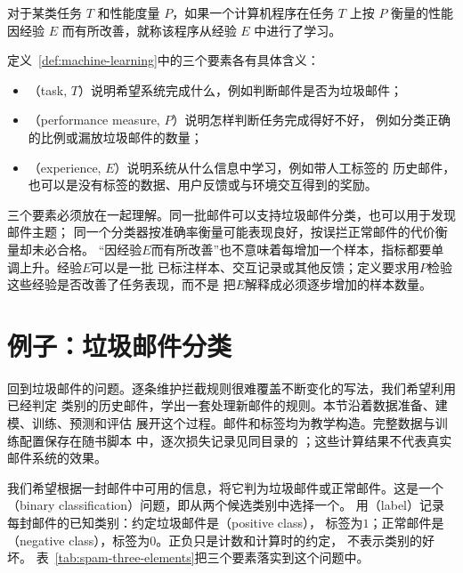 \begin{definition}[机器学习]
\label{def:machine-learning}
对于某类任务 $T$ 和性能度量 $P$，如果一个计算机程序在任务 $T$ 上按 $P$ 衡量的性能
因经验 $E$ 而有所改善，就称该程序从经验 $E$ 中进行了学习。
\end{definition}

定义~\ref{def:machine-learning}中的三个要素各有具体含义：

\begin{itemize}
  \item {}（task, $T$）说明希望系统完成什么，例如判断邮件是否为垃圾邮件；
  \item {}（performance measure, $P$）说明怎样判断任务完成得好不好，
    例如分类正确的比例或漏放垃圾邮件的数量；
  \item {}（experience, $E$）说明系统从什么信息中学习，例如带人工标签的
    历史邮件，也可以是没有标签的数据、用户反馈或与环境交互得到的奖励。
\end{itemize}

三个要素必须放在一起理解。同一批邮件可以支持垃圾邮件分类，也可以用于发现邮件主题；
同一个分类器按准确率衡量可能表现良好，按误拦正常邮件的代价衡量却未必合格。
“因经验$E$而有所改善”也不意味着每增加一个样本，指标都要单调上升。经验$E$可以是一批
已标注样本、交互记录或其他反馈；定义要求用$P$检验这些经验是否改善了任务表现，而不是
把$E$解释成必须逐步增加的样本数量。

\section{例子：垃圾邮件分类}
\label{sec:spam-classification-example}

回到垃圾邮件的问题。逐条维护拦截规则很难覆盖不断变化的写法，我们希望利用已经判定
类别的历史邮件，学出一套处理新邮件的规则。本节沿着数据准备、建模、训练、预测和评估
展开这个过程。邮件和标签均为教学构造。完整数据与训练配置保存在随书脚本
中，逐次损失记录见同目录的
；这些计算结果不代表真实邮件系统的效果。

我们希望根据一封邮件中可用的信息，将它判为垃圾邮件或正常邮件。这是一个
（binary classification）问题，即从两个候选类别中选择一个。
用（label）记录每封邮件的已知类别：约定垃圾邮件是（positive class），
标签为$1$；正常邮件是（negative class），标签为$0$。正负只是计数和计算时的约定，
不表示类别的好坏。
表~\ref{tab:spam-three-elements}把三个要素落实到这个问题中。

